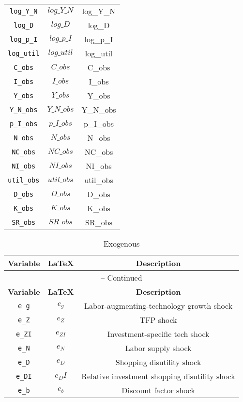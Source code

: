 \begin{center}
\begin{longtable}{ccc}
\texttt{log\_Y\_N} & $log\_Y\_N$ & log\_Y\_N\\
\texttt{log\_D} & $log\_D$ & log\_D\\
\texttt{log\_p\_I} & $log\_p\_I$ & log\_p\_I\\
\texttt{log\_util} & $log\_util$ & log\_util\\
\texttt{C\_obs} & $C\_obs$ & C\_obs\\
\texttt{I\_obs} & $I\_obs$ & I\_obs\\
\texttt{Y\_obs} & $Y\_obs$ & Y\_obs\\
\texttt{Y\_N\_obs} & $Y\_N\_obs$ & Y\_N\_obs\\
\texttt{p\_I\_obs} & $p\_I\_obs$ & p\_I\_obs\\
\texttt{N\_obs} & $N\_obs$ & N\_obs\\
\texttt{NC\_obs} & $NC\_obs$ & NC\_obs\\
\texttt{NI\_obs} & $NI\_obs$ & NI\_obs\\
\texttt{util\_obs} & $util\_obs$ & util\_obs\\
\texttt{D\_obs} & $D\_obs$ & D\_obs\\
\texttt{K\_obs} & $K\_obs$ & K\_obs\\
\texttt{SR\_obs} & $SR\_obs$ & SR\_obs\\
\hline%
\end{longtable}
\end{center}
\begin{center}
\begin{longtable}{ccc}
\caption{Exogenous}\\%
\hline%
\multicolumn{1}{c}{\textbf{Variable}} &
\multicolumn{1}{c}{\textbf{\LaTeX}} &
\multicolumn{1}{c}{\textbf{Description}}\\%
\hline\hline%
\endfirsthead
\multicolumn{3}{c}{{\tablename} \thetable{} -- Continued}\\%
\hline%
\multicolumn{1}{c}{\textbf{Variable}} &
\multicolumn{1}{c}{\textbf{\LaTeX}} &
\multicolumn{1}{c}{\textbf{Description}}\\%
\hline\hline%
\endhead
\texttt{e\_g} & ${e_g}$ & Labor-augmenting-technology growth shock\\
\texttt{e\_Z} & ${e_Z}$ & TFP shock\\
\texttt{e\_ZI} & ${e_{ZI}}$ & Investment-specific tech shock\\
\texttt{e\_N} & ${e_N}$ & Labor supply shock\\
\texttt{e\_D} & ${e_D}$ & Shopping disutility shock\\
\texttt{e\_DI} & ${e_DI}$ & Relative investment shopping disutility shock\\
\texttt{e\_b} & ${e_b}$ & Discount factor shock\\
\hline%
\end{longtable}
\end{center}
